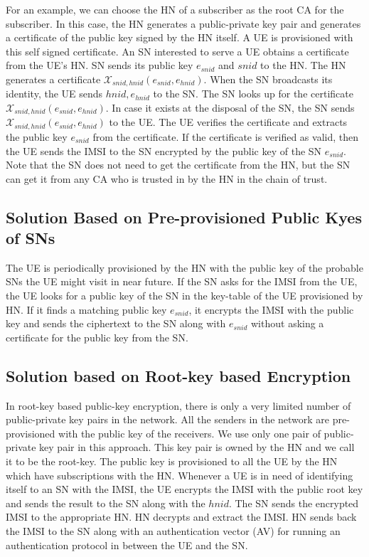 \documentclass[runningheads,a4paper]{llncs} %
\begin{document}
For an example, we can choose the HN of a subscriber as the root CA for the subscriber. In this case, the HN generates a public-private key pair and generates a certificate of the public key signed by the HN itself. A UE is provisioned with this self signed certificate. An SN interested to serve a UE obtains a certificate from the UE's HN. SN sends its public key $e_{snid}$ and $snid$ to the HN. The HN generates a certificate $\mathcal{X}_{snid,hnid} (e_{snid},e_{hnid})$. When the SN broadcasts its identity, the UE sends $hnid,e_{hnid}$ to the SN. The SN looks up for the certificate $\mathcal{X}_{snid,hnid} (e_{snid},e_{hnid})$. In case it exists at the disposal of the SN, the SN sends $\mathcal{X}_{snid,hnid} (e_{snid},e_{hnid})$ to the UE. The UE verifies the certificate and extracts the public key $e_{snid}$ from the certificate. If the certificate is verified as valid, then the UE sends the IMSI to the SN encrypted by the public key of the SN $e_{snid}$.  Note that the SN does not need to get the certificate from the HN, but the SN can get it from any CA who is trusted in by the HN in the chain of trust.


\subsection{Solution Based on Pre-provisioned Public Kyes of SNs} 
\label{sub_sec:solution_certificate_short_chain_pre-provisioned_keys}
The UE is periodically provisioned by the HN with the public key of the probable SNs the UE might visit in near future. If the SN asks for the IMSI from the UE, the UE looks for a public key of the SN in the key-table of the UE provisioned by HN. If it finds a matching public key $e_{snid}$, it encrypts the IMSI with the public key and sends the ciphertext to the SN along with $e_{snid}$ without asking a certificate for the public key from the SN.



\subsection{Solution based on Root-key based Encryption} 
\label{sub_sec:solution_root-key}
In root-key based public-key encryption, there is only a very limited number of public-private key pairs in the network. All the senders in the network are pre-provisioned with the public key of the receivers. We use only one pair of public-private key pair in this approach. This key pair is owned by the HN and we call it to be the root-key. The public key is provisioned to all the UE by the HN which have subscriptions with the HN. Whenever a UE is in need of identifying itself to an SN with the IMSI, the UE encrypts the IMSI with the public root key and sends the result to the SN along with the $hnid$. The SN sends the encrypted IMSI to the appropriate HN. HN decrypts and extract the IMSI. HN sends back the IMSI to the SN along with an authentication vector (AV) for running an authentication protocol in between the UE and the SN.
\end{document}
